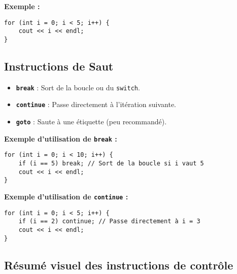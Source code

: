 \textbf{Exemple :}
\begin{tcolorbox}[colframe=blue!50!black, colback=blue!5!white, title=Exemple de la Boucle for]
\begin{verbatim}
for (int i = 0; i < 5; i++) {
    cout << i << endl;
}
\end{verbatim}
\end{tcolorbox}

\subsection{ Instructions de Saut}
\begin{itemize}
    \item \textbf{\texttt{break}} : Sort de la boucle ou du \texttt{switch}.
    \item \textbf{\texttt{continue}} : Passe directement à l'itération suivante.
    \item \textbf{\texttt{goto}} : Saute à une étiquette (peu recommandé).
\end{itemize}

\textbf{Exemple d'utilisation de \texttt{break} :}
\begin{tcolorbox}[colframe=blue!50!black, colback=blue!5!white, title=Exemple d'Utilisation de break]
\begin{verbatim}
for (int i = 0; i < 10; i++) {
    if (i == 5) break; // Sort de la boucle si i vaut 5
    cout << i << endl;
}
\end{verbatim}
\end{tcolorbox}

\textbf{Exemple d'utilisation de \texttt{continue} :}
\begin{tcolorbox}[colframe=blue!50!black, colback=blue!5!white, title=Exemple d'Utilisation de continue]
\begin{verbatim}
for (int i = 0; i < 5; i++) {
    if (i == 2) continue; // Passe directement à i = 3
    cout << i << endl;
}
\end{verbatim}
\end{tcolorbox}

\subsection{ Résumé visuel des instructions de contrôle}
\begin{center}
\end{center}
